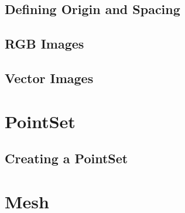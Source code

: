 \subsection{Defining Origin and Spacing}
\label{sec:DefiningImageOriginAndSpacing}
%
%



\subsection{RGB Images}
\label{sec:DefiningRGBImages}
%
%



\subsection{Vector Images}
\label{sec:DefiningVectorImages}
%
%




\section{PointSet}\label{PointSetSection}

\subsection{Creating a PointSet}\label{sec:CreatingAPointSet}

%
%






\section{Mesh}\label{MeshSection}


